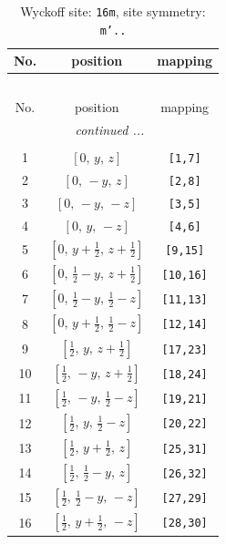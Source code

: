 \documentclass[fleqn,8pt]{jsarticle}
\begin{document}
\renewcommand{\arraystretch}{1.2}
\begin{longtable}{ccc}
\caption{Wyckoff site: {\tt 16m}, site symmetry: {\tt m'..}}
 \\
 \hline \hline
No. & position & mapping \\ \hline \endfirsthead

\multicolumn{2}{l}{\tablename\ \thetable{}} \\
 \hline \hline
No. & position & mapping \\ \hline \endhead

 \hline \hline
\multicolumn{2}{r}{\footnotesize\it continued ...} \\ \endfoot

 \hline \hline
\multicolumn{2}{r}{} \\ \endlastfoot

1 & $\left[ 0,\, y,\, z \right]$ & {\tt [1,7]} \\ \hline
2 & $\left[ 0,\, - y,\, z \right]$ & {\tt [2,8]} \\ \hline
3 & $\left[ 0,\, - y,\, - z \right]$ & {\tt [3,5]} \\ \hline
4 & $\left[ 0,\, y,\, - z \right]$ & {\tt [4,6]} \\ \hline
5 & $\left[ 0,\, y + \frac{1}{2},\, z + \frac{1}{2} \right]$ & {\tt [9,15]} \\ \hline
6 & $\left[ 0,\, \frac{1}{2} - y,\, z + \frac{1}{2} \right]$ & {\tt [10,16]} \\ \hline
7 & $\left[ 0,\, \frac{1}{2} - y,\, \frac{1}{2} - z \right]$ & {\tt [11,13]} \\ \hline
8 & $\left[ 0,\, y + \frac{1}{2},\, \frac{1}{2} - z \right]$ & {\tt [12,14]} \\ \hline
9 & $\left[ \frac{1}{2},\, y,\, z + \frac{1}{2} \right]$ & {\tt [17,23]} \\ \hline
10 & $\left[ \frac{1}{2},\, - y,\, z + \frac{1}{2} \right]$ & {\tt [18,24]} \\ \hline
11 & $\left[ \frac{1}{2},\, - y,\, \frac{1}{2} - z \right]$ & {\tt [19,21]} \\ \hline
12 & $\left[ \frac{1}{2},\, y,\, \frac{1}{2} - z \right]$ & {\tt [20,22]} \\ \hline
13 & $\left[ \frac{1}{2},\, y + \frac{1}{2},\, z \right]$ & {\tt [25,31]} \\ \hline
14 & $\left[ \frac{1}{2},\, \frac{1}{2} - y,\, z \right]$ & {\tt [26,32]} \\ \hline
15 & $\left[ \frac{1}{2},\, \frac{1}{2} - y,\, - z \right]$ & {\tt [27,29]} \\ \hline
16 & $\left[ \frac{1}{2},\, y + \frac{1}{2},\, - z \right]$ & {\tt [28,30]} \\
\end{longtable}
\end{document}
